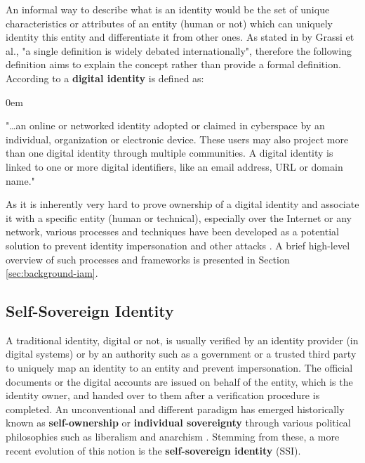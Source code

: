 An informal way to describe what is an identity would be the set of unique characteristics or attributes of an entity (human or not) which can uniquely identity this entity and differentiate it from other ones. As stated in \cite{digital-identity-guidelines} by Grassi et al., "a single definition is widely debated internationally", therefore the following definition aims to explain the concept rather than provide a formal definition. According to \cite{digital-identity-techopedia} a \textbf{digital identity} is defined as: 

\begin{description}
	\itemsep0em
	\item[] "\dots an online or networked identity adopted or claimed in cyberspace by an individual, organization or electronic device. These users may also project more than one digital identity through multiple communities. A digital identity is linked to one or more digital identifiers, like an email address, URL or domain name."
\end{description}

As it is inherently very hard to prove ownership of a digital identity and associate it with a specific entity (human or technical), especially over the Internet or any network, various processes and techniques have been developed as a potential solution to prevent identity impersonation and other attacks \cite{digital-identity-guidelines}. A brief high-level overview of such processes and frameworks is presented in Section \ref{sec:background-iam}.

\subsection{Self-Sovereign Identity}

A traditional identity, digital or not, is usually verified by an identity provider (in digital systems) or by an authority such as a government or a trusted third party to uniquely map an identity to an entity and prevent impersonation. The official documents or the digital accounts are issued on behalf of the entity, which is the identity owner, and handed over to them after a verification procedure is completed. An unconventional and different paradigm has emerged historically known as \textbf{self-ownership} or \textbf{individual sovereignty} through various political philosophies such as liberalism and anarchism \cite{kohl_politics_1991}. Stemming from these, a more recent evolution of this notion is the \textbf{self-sovereign identity} (SSI). 

